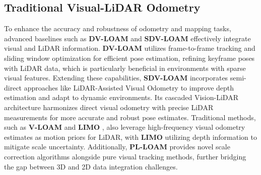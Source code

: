 \documentclass[11pt,a4paper]{article}
\begin{document}
\subsection{Traditional Visual-LiDAR Odometry}
To enhance the accuracy and robustness of odometry and mapping tasks, advanced baselines such as \textbf{DV-LOAM} \cite{dv-loam} and \textbf{SDV-LOAM} \cite{sdv-loam} effectively integrate visual and LiDAR information. \textbf{DV-LOAM} utilizes frame-to-frame tracking and sliding window optimization for efficient pose estimation, refining keyframe poses with LiDAR data, which is particularly beneficial in environments with sparse visual features. Extending these capabilities, \textbf{SDV-LOAM} incorporates semi-direct approaches like LiDAR-Assisted Visual Odometry to improve depth estimation and adapt to dynamic environments. Its cascaded Vision-LiDAR architecture harmonizes direct visual odometry with precise LiDAR measurements for more accurate and robust pose estimates. Traditional methods, such as \textbf{V-LOAM} \cite{zhang2015visual} and \textbf{LIMO} \cite{graeter2018limo}, also leverage high-frequency visual odometry estimates as motion priors for LiDAR, with \textbf{LIMO} utilizing depth information to mitigate scale uncertainty. Additionally, \textbf{PL-LOAM} \cite{huang2020lidar} provides novel scale correction algorithms alongside pure visual tracking methods, further bridging the gap between 3D and 2D data integration challenges.



\end{document}
